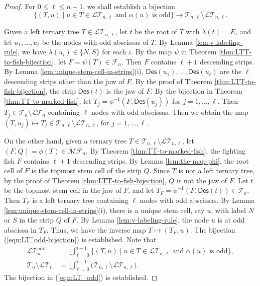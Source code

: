 \documentclass[10pt,a4paper]{amsart}
\newcommand{\Des}{{\textsf{Des}}}
\newcommand{\F}{{\mathcal{F}}}
\newcommand{\LT}{{\mathcal{LT}}}
\newcommand{\MF}{{\mathcal{MF}}}
\newcommand{\T}{{\mathcal{T}}}
\newcommand{\odd}{{\textrm{odd}}}
\begin{document}
\begin{proof}
For $0\le \ell\le n-1$, we shall establish a bijection
\begin{equation} \label{eqn:LT^odd-bijection}
\{(T,u)\mid u\in T\in\LT_{n,\ell}\mbox{ and $\alpha(u)$ is odd}\}\rightarrow\T_{n,\ell}\setminus\LT_{n,\ell}.
\end{equation}

Given a left ternary tree $T\in\LT_{n,\ell}$, let $t$ be the root of $T$ with $\lambda(t)=E$, and let $u_1,\dots,u_{\ell}$ be the nodes with odd abscissas of $T$.  By Lemma \ref{lem:v-labeling-rule}, we have $\lambda(u_i)\in\{N,S\}$ for each $i$. By the map $\psi$ in Theorem \ref{thm:LTT-to-fish-bijection}, let $F=\psi(T)\in\F_n$.  Then $F$ contains $\ell+1$ descending strips. By Lemma \ref{lem:unique-stem-cell-in-strips}(i), $\Des(u_1),\dots,\Des(u_{\ell})$ are the $\ell$ descending strips other than the jaw of $F$. By the proof of Theorem \ref{thm:LTT-to-fish-bijection}, the strip $\Des(t)$ is the jaw of $F$.
By the bijection in Theorem \ref{thm:TT-to-marked-fish}, let $T_j=\phi^{-1}(F,\Des(u_j))$ for $j=1,\dots, \ell$. Then $T_j\in\T_n\setminus\LT_n$ containing $\ell$ nodes with odd abscissas. Then we obtain the map $(T,u_j)\mapsto T_j\in\T_{n,\ell}\setminus\LT_{n,\ell}$, for $j=1,\dots, \ell$.

On the other hand, given a ternary tree $T\in\T_{n,\ell}\setminus\LT_{n,\ell}$, let $(F,Q)=\phi(T)\in\MF_n$. By Theorem \ref{thm:TT-to-marked-fish}, the fighting fish $F$ contains $\ell+1$ descending strips. By Lemma \ref{lem:the-map-phi}, the root cell of $F$ is the topmost stem cell of the strip $Q$. Since $T$ is not a left ternary tree, by the proof of Theorem \ref{thm:LTT-to-fish-bijection}, $Q$ is not the jaw of $F$. Let $t$ be the topmost stem cell in the jaw of $F$, and let $T_F=\phi^{-1}(F,\Des(t))\in\T_n$. Then $T_F$ is a left ternary tree containing $\ell$ nodes with odd abscissas. By Lemma \ref{lem:unique-stem-cell-in-strips}(i), there is a unique stem cell, say $u$, with label $N$ or $S$ in the strip $Q$ of $F$. By Lemma \ref{lem:v-labeling-rule}, the node $u$ is at odd abscissa in $T_F$. Thus, we have the inverse map $T\mapsto (T_F,u)$. The bijection (\ref{eqn:LT^odd-bijection}) is established. Note that 
\begin{align*}
\LT_n^{\odd} &= \bigcup_{\ell=0}^{n-1} 
\{(T,u)\mid u\in T\in\LT_{n,\ell}\mbox{ and $\alpha(u)$ is odd}\}, \\
\T_n\setminus \LT_n &= \bigcup_{\ell=0}^{n-1} \big(\T_{n,\ell} \setminus\LT_{n,\ell}\big).
\end{align*}
The bijection in (\ref{eqn:LT_odd}) is established.


\end{proof}
\end{document}
